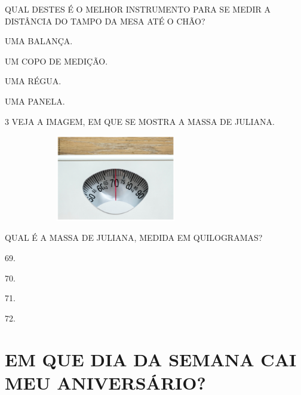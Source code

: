 QUAL DESTES É O MELHOR INSTRUMENTO PARA SE MEDIR A DISTÂNCIA DO TAMPO DA MESA ATÉ O CHÃO?

\begin{multicols}{2}
\begin{escolha}[itemsep=-5pt]
\item UMA BALANÇA.

\item UM COPO DE MEDIÇÃO.

\item UMA RÉGUA.

\item UMA PANELA.
\end{escolha}
\end{multicols}

\num{3} VEJA A IMAGEM, EM QUE SE MOSTRA A MASSA DE JULIANA.


\begin{figure}[htpb!]
\centering
\includegraphics[width=3.03770in,height=1.48580in]{./media/SAEB_1ANO_MAT_FIGURA44.png}
\end{figure}

QUAL É A MASSA DE JULIANA, MEDIDA EM QUILOGRAMAS?

\begin{multicols}{2}
\begin{escolha}[itemsep=-5pt]
\item 69.

\item 70.

\item 71.

\item 72.
\end{escolha}
\end{multicols}

\chapter[{EM QUE DIA DA SEMANA CAI MEU ANIVERSÁRIO?}]{\large EM QUE DIA DA SEMANA CAI MEU ANIVERSÁRIO?}

